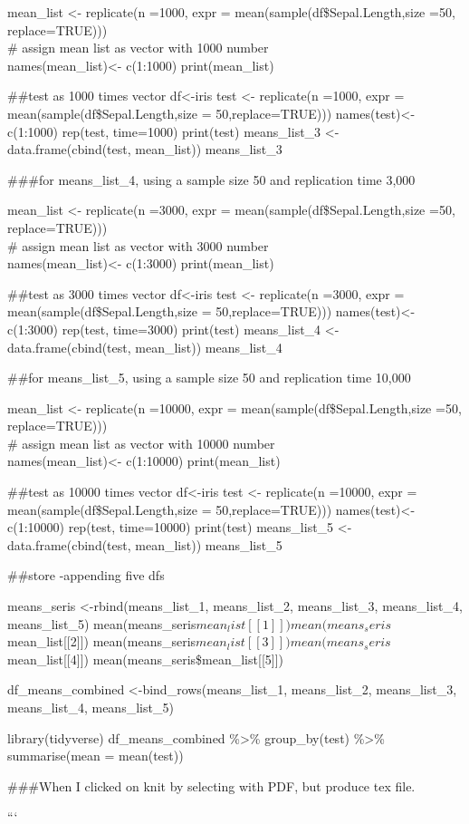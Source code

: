 \documentclass[
]{article}
\begin{document}
mean\_list \textless- replicate(n =1000, expr =
mean(sample(df\$Sepal.Length,size =50, replace=TRUE)))\\
\# assign mean list as vector with 1000 number\\
names(mean\_list)\textless- c(1:1000) print(mean\_list)

\#\#test as 1000 times vector df\textless-iris test \textless-
replicate(n =1000, expr = mean(sample(df\$Sepal.Length,size =
50,replace=TRUE))) names(test)\textless- c(1:1000) rep(test, time=1000)
print(test) means\_list\_3 \textless- data.frame(cbind(test,
mean\_list)) means\_list\_3

\#\#\#for means\_list\_4, using a sample size 50 and replication time
3,000

mean\_list \textless- replicate(n =3000, expr =
mean(sample(df\$Sepal.Length,size =50, replace=TRUE)))\\
\# assign mean list as vector with 3000 number\\
names(mean\_list)\textless- c(1:3000) print(mean\_list)

\#\#test as 3000 times vector df\textless-iris test \textless-
replicate(n =3000, expr = mean(sample(df\$Sepal.Length,size =
50,replace=TRUE))) names(test)\textless- c(1:3000) rep(test, time=3000)
print(test) means\_list\_4 \textless- data.frame(cbind(test,
mean\_list)) means\_list\_4

\#\#for means\_list\_5, using a sample size 50 and replication time
10,000

mean\_list \textless- replicate(n =10000, expr =
mean(sample(df\$Sepal.Length,size =50, replace=TRUE)))\\
\# assign mean list as vector with 10000 number\\
names(mean\_list)\textless- c(1:10000) print(mean\_list)

\#\#test as 10000 times vector df\textless-iris test \textless-
replicate(n =10000, expr = mean(sample(df\$Sepal.Length,size =
50,replace=TRUE))) names(test)\textless- c(1:10000) rep(test,
time=10000) print(test) means\_list\_5 \textless- data.frame(cbind(test,
mean\_list)) means\_list\_5

\#\#store -appending five dfs

means\_seris \textless-rbind(means\_list\_1, means\_list\_2,
means\_list\_3, means\_list\_4, means\_list\_5)
mean(means\_seris\(mean_list[[1]]) mean(means_seris\)mean\_list{[}{[}2{]}{]})
mean(means\_seris\(mean_list[[3]]) mean(means_seris\)mean\_list{[}{[}4{]}{]})
mean(means\_seris\$mean\_list{[}{[}5{]}{]})

df\_means\_combined \textless-bind\_rows(means\_list\_1, means\_list\_2,
means\_list\_3, means\_list\_4, means\_list\_5)

library(tidyverse) df\_means\_combined \%\textgreater\% group\_by(test)
\%\textgreater\% summarise(mean = mean(test))

\#\#\#When I clicked on knit by selecting with PDF, but produce tex
file.

```
\end{document}
